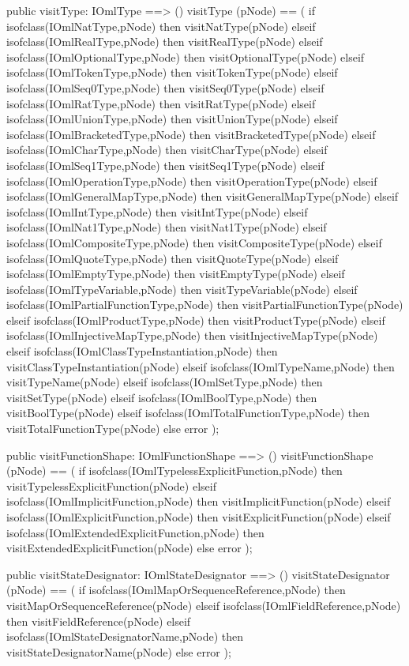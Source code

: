 \begin{vdm_al}
  public visitType: IOmlType ==> ()
  visitType (pNode) ==
    ( if isofclass(IOmlNatType,pNode) then visitNatType(pNode)
      elseif isofclass(IOmlRealType,pNode) then visitRealType(pNode)
      elseif isofclass(IOmlOptionalType,pNode) then visitOptionalType(pNode)
      elseif isofclass(IOmlTokenType,pNode) then visitTokenType(pNode)
      elseif isofclass(IOmlSeq0Type,pNode) then visitSeq0Type(pNode)
      elseif isofclass(IOmlRatType,pNode) then visitRatType(pNode)
      elseif isofclass(IOmlUnionType,pNode) then visitUnionType(pNode)
      elseif isofclass(IOmlBracketedType,pNode) then visitBracketedType(pNode)
      elseif isofclass(IOmlCharType,pNode) then visitCharType(pNode)
      elseif isofclass(IOmlSeq1Type,pNode) then visitSeq1Type(pNode)
      elseif isofclass(IOmlOperationType,pNode) then visitOperationType(pNode)
      elseif isofclass(IOmlGeneralMapType,pNode) then visitGeneralMapType(pNode)
      elseif isofclass(IOmlIntType,pNode) then visitIntType(pNode)
      elseif isofclass(IOmlNat1Type,pNode) then visitNat1Type(pNode)
      elseif isofclass(IOmlCompositeType,pNode) then visitCompositeType(pNode)
      elseif isofclass(IOmlQuoteType,pNode) then visitQuoteType(pNode)
      elseif isofclass(IOmlEmptyType,pNode) then visitEmptyType(pNode)
      elseif isofclass(IOmlTypeVariable,pNode) then visitTypeVariable(pNode)
      elseif isofclass(IOmlPartialFunctionType,pNode) then visitPartialFunctionType(pNode)
      elseif isofclass(IOmlProductType,pNode) then visitProductType(pNode)
      elseif isofclass(IOmlInjectiveMapType,pNode) then visitInjectiveMapType(pNode)
      elseif isofclass(IOmlClassTypeInstantiation,pNode) then visitClassTypeInstantiation(pNode)
      elseif isofclass(IOmlTypeName,pNode) then visitTypeName(pNode)
      elseif isofclass(IOmlSetType,pNode) then visitSetType(pNode)
      elseif isofclass(IOmlBoolType,pNode) then visitBoolType(pNode)
      elseif isofclass(IOmlTotalFunctionType,pNode) then visitTotalFunctionType(pNode)
      else error );

  public visitFunctionShape: IOmlFunctionShape ==> ()
  visitFunctionShape (pNode) ==
    ( if isofclass(IOmlTypelessExplicitFunction,pNode) then visitTypelessExplicitFunction(pNode)
      elseif isofclass(IOmlImplicitFunction,pNode) then visitImplicitFunction(pNode)
      elseif isofclass(IOmlExplicitFunction,pNode) then visitExplicitFunction(pNode)
      elseif isofclass(IOmlExtendedExplicitFunction,pNode) then visitExtendedExplicitFunction(pNode)
      else error );

  public visitStateDesignator: IOmlStateDesignator ==> ()
  visitStateDesignator (pNode) ==
    ( if isofclass(IOmlMapOrSequenceReference,pNode) then visitMapOrSequenceReference(pNode)
      elseif isofclass(IOmlFieldReference,pNode) then visitFieldReference(pNode)
      elseif isofclass(IOmlStateDesignatorName,pNode) then visitStateDesignatorName(pNode)
      else error );


\end{vdm_al}
